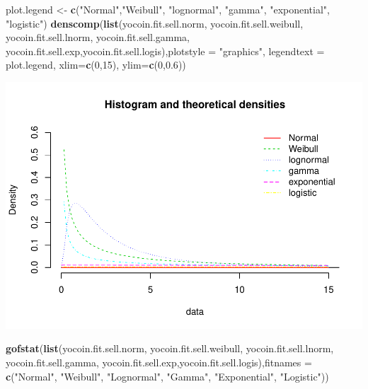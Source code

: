 \documentclass[]{article}
\newenvironment{Shaded}{\begin{snugshade}}{\end{snugshade}}
\newcommand{\KeywordTok}[1]{\textcolor[rgb]{0.13,0.29,0.53}{\textbf{#1}}}
\newcommand{\DataTypeTok}[1]{\textcolor[rgb]{0.13,0.29,0.53}{#1}}
\newcommand{\DecValTok}[1]{\textcolor[rgb]{0.00,0.00,0.81}{#1}}
\newcommand{\FloatTok}[1]{\textcolor[rgb]{0.00,0.00,0.81}{#1}}
\newcommand{\StringTok}[1]{\textcolor[rgb]{0.31,0.60,0.02}{#1}}
\newcommand{\NormalTok}[1]{#1}
\begin{document}
\begin{Shaded}
\begin{Highlighting}[]
\NormalTok{plot.legend <-}\StringTok{ }\KeywordTok{c}\NormalTok{(}\StringTok{"Normal"}\NormalTok{,}\StringTok{"Weibull"}\NormalTok{, }\StringTok{"lognormal"}\NormalTok{, }\StringTok{"gamma"}\NormalTok{, }\StringTok{"exponential"}\NormalTok{, }\StringTok{"logistic"}\NormalTok{)}
\KeywordTok{denscomp}\NormalTok{(}\KeywordTok{list}\NormalTok{(yocoin.fit.sell.norm, yocoin.fit.sell.weibull, yocoin.fit.sell.lnorm, yocoin.fit.sell.gamma, yocoin.fit.sell.exp,yocoin.fit.sell.logis),}\DataTypeTok{plotstyle =} \StringTok{"graphics"}\NormalTok{, }\DataTypeTok{legendtext =}\NormalTok{ plot.legend, }\DataTypeTok{xlim=}\KeywordTok{c}\NormalTok{(}\DecValTok{0}\NormalTok{,}\DecValTok{15}\NormalTok{), }\DataTypeTok{ylim=}\KeywordTok{c}\NormalTok{(}\DecValTok{0}\NormalTok{,}\FloatTok{0.6}\NormalTok{)) }
\end{Highlighting}
\end{Shaded}

\includegraphics{analysis_files/figure-latex/unnamed-chunk-38-1.pdf}

\begin{Shaded}
\begin{Highlighting}[]
\KeywordTok{gofstat}\NormalTok{(}\KeywordTok{list}\NormalTok{(yocoin.fit.sell.norm, yocoin.fit.sell.weibull, yocoin.fit.sell.lnorm, yocoin.fit.sell.gamma, yocoin.fit.sell.exp,yocoin.fit.sell.logis),}\DataTypeTok{fitnames =} \KeywordTok{c}\NormalTok{(}\StringTok{"Normal"}\NormalTok{, }\StringTok{"Weibull"}\NormalTok{, }\StringTok{"Lognormal"}\NormalTok{, }\StringTok{"Gamma"}\NormalTok{, }\StringTok{"Exponential"}\NormalTok{, }\StringTok{"Logistic"}\NormalTok{))}
\end{Highlighting}
\end{Shaded}
\end{document}
